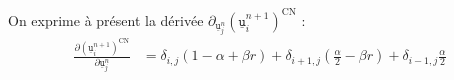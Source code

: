 \documentclass[a4paper,12pt]{article}
\newcommand{\bepar}[1]{
	\left( #1 \right)  
}
\newcommand{\uin}[2]{
	\underline{\texttt{u}}_{#1}^{#2}
}
\newcommand{\ui}[1]{
	\underline{\texttt{u}}_{#1}^{n}
}
\newcommand{\dij}[1]{
	\delta_{#1,j}
}
\numberwithin{equation}{section} %
\begin{document}
 \noindent On exprime à présent la dérivée $\partial_{\ui{j}} \bepar{\uin{i}{n+1}}^\text{CN}$ :
 \begin{align*}
 \frac{\partial \bepar{\uin{i}{n+1}}^\text{CN}}{\partial \ui{j} } & = \dij{i}\bepar{1 - \alpha +  \beta r} + \dij{i+1}\bepar{\frac{\alpha}{2} - \beta r} + \dij{i-1}\frac{\alpha}{2}
 \end{align*}
\end{document}
